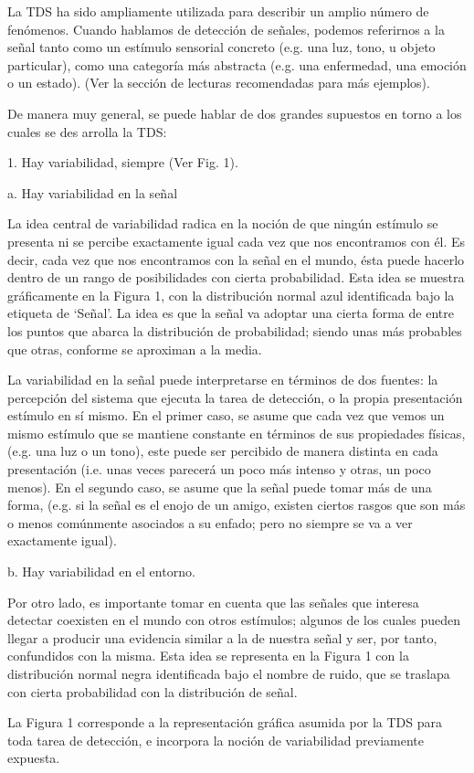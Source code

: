 \documentclass[letterpaper,12pt]{article}
\begin{document}
La TDS ha sido ampliamente utilizada para describir un amplio número de fenómenos. Cuando hablamos de detección de señales, podemos referirnos a la señal tanto como un estímulo sensorial concreto (e.g. una luz, tono, u objeto particular), como una categoría más abstracta (e.g. una enfermedad, una emoción o un estado).  (Ver la sección de lecturas recomendadas para más ejemplos).

De manera muy general, se puede hablar de dos grandes supuestos en torno a los cuales se des arrolla la TDS:

1. Hay variabilidad, siempre (Ver Fig. 1).

a. Hay variabilidad en la señal

La idea central de variabilidad radica en la noción de que ningún estímulo se presenta ni se percibe exactamente igual cada vez que nos encontramos con él.  Es decir, cada vez que nos encontramos con la  señal en el mundo, ésta puede hacerlo dentro de un rango de posibilidades con cierta probabilidad. Esta idea se muestra gráficamente en la Figura 1, con la distribución normal azul identificada bajo la etiqueta de ‘Señal’. La idea es que la señal va adoptar una cierta forma de entre los puntos que abarca la distribución de probabilidad; siendo unas más probables que otras, conforme se aproximan a la media.

La variabilidad en la señal puede interpretarse en términos de dos fuentes: la percepción del sistema que ejecuta la tarea de detección, o la propia presentación estímulo en sí mismo. En el primer caso, se asume que cada vez que vemos un mismo estímulo que se mantiene constante en términos de sus propiedades físicas,  (e.g. una luz o un tono),  este puede ser percibido de manera distinta en cada presentación (i.e. unas veces parecerá un poco más intenso y otras, un poco menos). En el segundo caso, se asume que la señal puede tomar más de una forma, (e.g. si la señal es el enojo de un amigo, existen ciertos rasgos que son más o menos comúnmente asociados a su enfado; pero no siempre se va a ver exactamente igual).

b. Hay variabilidad en el entorno.

Por otro lado, es importante tomar en cuenta que las señales que interesa detectar coexisten en el mundo con otros estímulos; algunos de los cuales pueden llegar a producir una evidencia similar a la de nuestra señal y ser, por tanto, confundidos con la misma. Esta idea se representa en la Figura 1 con la distribución normal negra identificada bajo el nombre de ruido, que se traslapa con cierta probabilidad con la distribución de señal.

La Figura 1 corresponde a la representación gráfica asumida por la TDS para toda tarea de detección, e incorpora la noción de variabilidad previamente expuesta. 
\end{document}
